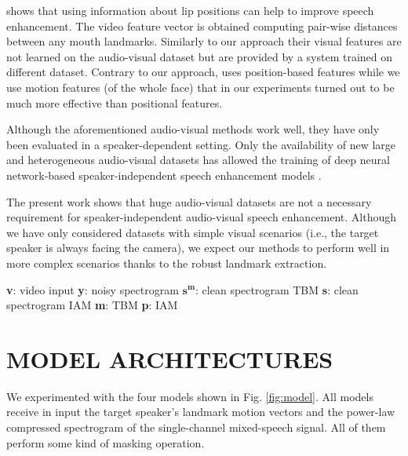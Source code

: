 \documentclass{article}
\begin{document}
\cite{hou_audio-visual_2016} shows that using information about lip positions can help to improve speech enhancement. The video feature vector is obtained computing pair-wise distances between any mouth landmarks. 
Similarly to our approach their visual features are not learned on the audio-visual dataset but are provided by a system trained on different dataset. Contrary to our approach, \cite{hou_audio-visual_2016} uses position-based features while we use motion features (of the whole face) that in our experiments turned out to be much more effective than positional features.  

Although the aforementioned audio-visual methods work well, they have only been evaluated in a speaker-dependent setting.
Only the availability of new large and heterogeneous audio-visual datasets has allowed the training of deep neural network-based speaker-independent  speech enhancement models \cite{ephrat_looking_2018, afouras_conversation:_2018, owens2018audio}. 

The present work shows that huge audio-visual datasets are not a necessary requirement for speaker-independent audio-visual speech enhancement. Although we have only considered datasets with simple visual scenarios (i.e., the target speaker is always facing the camera), we expect our methods to perform well in more complex scenarios thanks to the robust landmark extraction.
  
\begin{figure*}[t]
  \centering
  \footnotesize{\quad \textbf{v}: video input \qquad \textbf{y}: noisy spectrogram \qquad$\mathbf{s^m}$: clean spectrogram TBM \qquad\textbf{s}: clean spectrogram IAM \qquad \textbf{m}: TBM \qquad \textbf{p}: IAM}
  
  \caption{Model architectures.}
  \label{fig:model}
\end{figure*}

\section{MODEL ARCHITECTURES}
\label{sec:model}
We experimented with the four models shown in Fig. \ref{fig:model}.
All models receive in input the target speaker's landmark motion vectors and the power-law compressed spectrogram of the single-channel mixed-speech signal. All of them perform some kind of masking operation.
\end{document}
